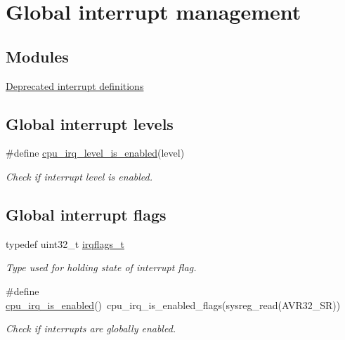 \hypertarget{group__interrupt__group}{
\section{\-Global interrupt management}
\label{group__interrupt__group}
}
\subsection*{\-Modules}
\begin{DoxyCompactItemize}
\item 
\hyperlink{group__interrupt__deprecated__group}{\-Deprecated interrupt definitions}
\end{DoxyCompactItemize}
\subsection*{\-Global interrupt levels}
\begin{DoxyCompactItemize}
\item 
\#define \hyperlink{group__interrupt__group_gaac8bab36e8dbe3b526b7869e18f827ea}{cpu\-\_\-irq\-\_\-level\-\_\-is\-\_\-enabled}(level)
\begin{DoxyCompactList}\small\item\em \-Check if interrupt level is enabled. \end{DoxyCompactList}\end{DoxyCompactItemize}
\subsection*{\-Global interrupt flags}
\begin{DoxyCompactItemize}
\item 
typedef uint32\-\_\-t \hyperlink{group__interrupt__group_ga9aa1f52defc97531b6343233abeea613}{irqflags\-\_\-t}
\begin{DoxyCompactList}\small\item\em \-Type used for holding state of interrupt flag. \end{DoxyCompactList}\item 
\#define \hyperlink{group__interrupt__group_gae1545a2473614564550b9c4015c94978}{cpu\-\_\-irq\-\_\-is\-\_\-enabled}()~cpu\-\_\-irq\-\_\-is\-\_\-enabled\-\_\-flags(sysreg\-\_\-read(\-A\-V\-R32\-\_\-\-S\-R))
\begin{DoxyCompactList}\small\item\em \-Check if interrupts are globally enabled. \end{DoxyCompactList}\end{DoxyCompactItemize}


